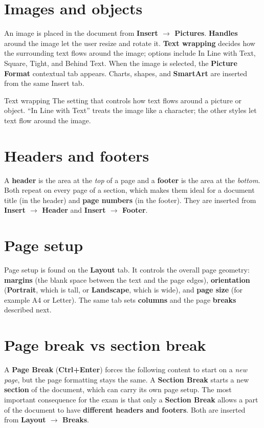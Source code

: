 \section{Images and objects}
An image is placed in the document from \textbf{Insert $\rightarrow$
Pictures}. \textbf{Handles} around the image let the user resize and rotate
it. \textbf{Text wrapping} decides how the surrounding text flows around the
image; options include In Line with Text, Square, Tight, and Behind Text.
When the image is selected, the \textbf{Picture Format} contextual tab
appears. Charts, shapes, and \textbf{SmartArt} are inserted from the same
Insert tab.

\begin{definitionbox}{Text wrapping}
The setting that controls how text flows around a picture or object. ``In
Line with Text'' treats the image like a character; the other styles let
text flow around the image.
\end{definitionbox}

\section{Headers and footers}
A \textbf{header} is the area at the \emph{top} of a page and a
\textbf{footer} is the area at the \emph{bottom}. Both repeat on every page
of a section, which makes them ideal for a document title (in the header)
and \textbf{page numbers} (in the footer). They are inserted from
\textbf{Insert $\rightarrow$ Header} and \textbf{Insert $\rightarrow$
Footer}.

\section{Page setup}
Page setup is found on the \textbf{Layout} tab. It controls the overall page
geometry: \textbf{margins} (the blank space between the text and the page
edges), \textbf{orientation} (\textbf{Portrait}, which is tall, or
\textbf{Landscape}, which is wide), and \textbf{page size} (for example A4
or Letter). The same tab sets \textbf{columns} and the page \textbf{breaks}
described next.

\section{Page break vs section break}
A \textbf{Page Break} (\textbf{Ctrl+Enter}) forces the following content to
start on a \emph{new page}, but the page formatting stays the same. A
\textbf{Section Break} starts a new \textbf{section} of the document, which
can carry its own page setup. The most important consequence for the exam is
that only a \textbf{Section Break} allows a part of the document to have
\textbf{different headers and footers}. Both are inserted from
\textbf{Layout $\rightarrow$ Breaks}.

